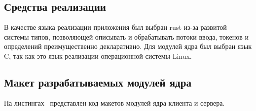 
\vspace{-1\baselineskip}

\subsection{Средства реализации}

В качестве языка реализации приложения был выбран rust из-за развитой системы
типов, позволяющей описывать и обрабатывать потоки ввода, токенов и определений
преимущественно декларативно. Для модулей ядра был выбран язык C, так как это
язык реализации операционной системы Linux.

\subsection{Макет разрабатываемых модулей ядра} \label{sec:prototype}

На листингах~
представлен код макетов модулей ядра клиента и сервера.

